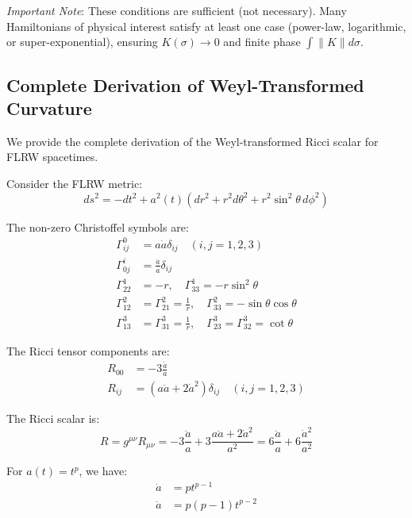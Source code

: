 \emph{Important Note}: These conditions are sufficient (not necessary). Many Hamiltonians of physical interest satisfy at least one case (power-law, logarithmic, or super-exponential), ensuring $K(\sigma) \to 0$ and finite phase $\int \|K\| d\sigma$.

\subsection{Complete Derivation of Weyl-Transformed Curvature}
\label{app:weyl_curvature_derivation}

We provide the complete derivation of the Weyl-transformed Ricci scalar for FLRW spacetimes.

Consider the FLRW metric:
\begin{equation}
ds^2 = -dt^2 + a^2(t) \left( dr^2 + r^2 d\theta^2 + r^2 \sin^2\theta \, d\phi^2 \right)
\end{equation}

The non-zero Christoffel symbols are:
\begin{align}
\Gamma^0_{ij} &= a \dot{a} \delta_{ij} \quad (i,j = 1,2,3) \\
\Gamma^i_{0j} &= \frac{\dot{a}}{a} \delta_{ij} \\
\Gamma^1_{22} &= -r, \quad \Gamma^1_{33} = -r \sin^2\theta \\
\Gamma^2_{12} &= \Gamma^2_{21} = \frac{1}{r}, \quad \Gamma^2_{33} = -\sin\theta \cos\theta \\
\Gamma^3_{13} &= \Gamma^3_{31} = \frac{1}{r}, \quad \Gamma^3_{23} = \Gamma^3_{32} = \cot\theta
\end{align}

The Ricci tensor components are:
\begin{align}
R_{00} &= -3 \frac{\ddot{a}}{a} \\
R_{ij} &= \left( a \ddot{a} + 2 \dot{a}^2 \right) \delta_{ij} \quad (i,j = 1,2,3)
\end{align}

The Ricci scalar is:
\begin{equation}
R = g^{\mu\nu} R_{\mu\nu} = -3 \frac{\ddot{a}}{a} + 3 \frac{a \ddot{a} + 2 \dot{a}^2}{a^2} = 6 \frac{\ddot{a}}{a} + 6 \frac{\dot{a}^2}{a^2}
\end{equation}

For $a(t) = t^p$, we have:
\begin{align}
\dot{a} &= p t^{p-1} \\
\ddot{a} &= p(p-1) t^{p-2}
\end{align}

